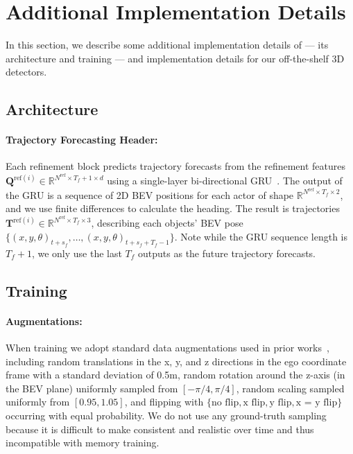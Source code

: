 \section{Additional Implementation Details}

In this section, we describe some additional implementation details of \ourmodel{} ---
its architecture and training ---
and implementation details for our off-the-shelf 3D detectors.

\subsection{Architecture}

\paragraph{Trajectory Forecasting Header:}


Each refinement block predicts trajectory forecasts from the refinement features $\mathbf{Q}^{\mathrm{ref}(i)} \in \mathbb{R}^{N^\mathrm{ref} \times T_f + 1 \times d}$ using a
single-layer bi-directional GRU~\cite{cho2014learning}.
The output of the GRU is %
a sequence of 2D BEV positions for each actor of shape $\mathbb{R}^{N^\mathrm{ref} \times T_f \times 2}$,
and we use finite differences to calculate the heading.
The result is trajectories
$\mathbf{T}^{\mathrm{ref}(i)} \in \mathbb{R}^{N^\mathrm{ref} \times T_f \times 3}$,
describing each objects' BEV pose $\{(x, y, \theta)_{t + s_f}, \dots, (x, y, \theta)_{t + s_f + T_f - 1}\}$.
Note while the GRU sequence length is $T_f + 1$, we only use the last $T_f$ outputs as the future trajectory forecasts.


\subsection{Training}

\paragraph{Augmentations:}

When training \ourmodel{} we adopt standard data augmentations used in prior works~\cite{safdnet,hednet,wang2023dsvt},
including random translations in the x, y, and z directions in the ego coordinate frame with a standard deviation of 0.5m,
random rotation around the z-axis (in the BEV plane) uniformly sampled from $[-\pi/4, \pi/4]$,
random scaling sampled uniformly from $[0.95, 1.05]$,
and flipping with $\{\text{no flip}, \text{x flip}, \text{y flip}, \text{x = y flip}\}$
occurring with equal probability.
We do not use any ground-truth sampling~\cite{yan2018second} because
it is difficult to make consistent and realistic over time and thus incompatible with memory training.


